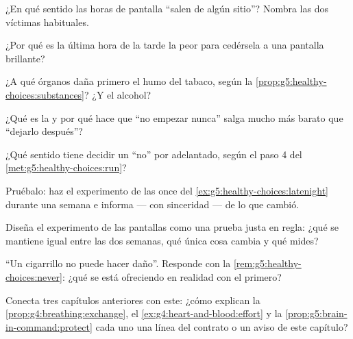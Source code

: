 \begin{exercise}[$\star$]\label{exo:g5:healthy-choices:3}
¿En qué sentido las horas de pantalla ``salen de algún sitio''?
Nombra las dos víctimas habituales.
\end{exercise}

\begin{exercise}[$\star$]\label{exo:g5:healthy-choices:4}
¿Por qué es la última hora de la tarde la peor para cedérsela a una
pantalla brillante?
\end{exercise}

\begin{exercise}[$\star$]\label{exo:g5:healthy-choices:5}
¿A qué órganos daña primero el humo del tabaco, según la
\cref{prop:g5:healthy-choices:substances}? ¿Y el alcohol?
\end{exercise}

\begin{exercise}[$\star$]\label{exo:g5:healthy-choices:6}
¿Qué es la  y por qué hace que ``no empezar nunca'' salga
mucho más barato que ``dejarlo después''?
\end{exercise}

\begin{exercise}[$\star$]\label{exo:g5:healthy-choices:7}
¿Qué sentido tiene decidir un ``no'' por adelantado, según el paso 4
del \cref{met:g5:healthy-choices:run}?
\end{exercise}

\begin{exercise}[$\star$]\label{exo:g5:healthy-choices:8}
Pruébalo: haz el experimento de las once del
\cref{ex:g5:healthy-choices:latenight} durante una semana e informa
--- con sinceridad --- de lo que cambió.
\end{exercise}

\begin{exercise}[$\star\star$]\label{exo:g5:healthy-choices:9}
Diseña el experimento de las pantallas como una prueba justa en regla:
¿qué se mantiene igual entre las dos semanas, qué única cosa cambia y
qué mides?
\end{exercise}

\begin{exercise}[$\star\star$]\label{exo:g5:healthy-choices:10}
``Un cigarrillo no puede hacer daño''. Responde con la
\cref{rem:g5:healthy-choices:never}: ¿qué se está ofreciendo en
realidad con el primero?
\end{exercise}

\begin{exercise}[$\star\star\star$]\label{exo:g5:healthy-choices:11}
Conecta tres capítulos anteriores con este: ¿cómo explican la
\cref{prop:g4:breathing:exchange}, el
\cref{ex:g4:heart-and-blood:effort} y la
\cref{prop:g5:brain-in-command:protect} cada uno una línea del contrato
o un aviso de este capítulo?
\end{exercise}
